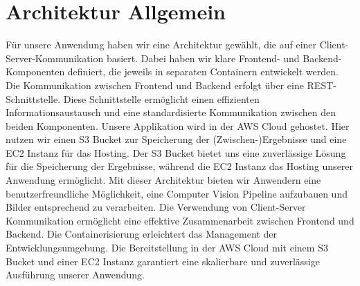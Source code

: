 \section{Architektur Allgemein}
Für unsere Anwendung haben wir eine Architektur gewählt, die auf einer Client-Server-Kommunikation basiert. Dabei haben wir klare Frontend- und Backend-Komponenten definiert, die jeweils in separaten Containern entwickelt werden. Die Kommunikation zwischen Frontend und Backend erfolgt über eine REST-Schnittstelle. Diese Schnittstelle ermöglicht einen effizienten Informationsaustausch und eine standardisierte Kommunikation zwischen den beiden Komponenten. Unsere Applikation wird in der AWS Cloud gehostet. Hier nutzen wir einen S3 Bucket zur Speicherung der (Zwischen-)Ergebnisse und eine EC2 Instanz für das Hosting. Der S3 Bucket bietet uns eine zuverlässige Lösung für die Speicherung der Ergebnisse, während die EC2 Instanz das Hosting unserer Anwendung ermöglicht. Mit dieser Architektur bieten wir Anwendern eine benutzerfreundliche Möglichkeit, eine Computer Vision Pipeline aufzubauen und Bilder entsprechend zu verarbeiten. Die Verwendung von Client-Server Kommunikation ermöglicht eine effektive Zusammenarbeit zwischen Frontend und Backend. Die Containerisierung erleichtert das Management der Entwicklungsumgebung. Die Bereitstellung in der AWS Cloud mit einem S3 Bucket und einer EC2 Instanz garantiert eine skalierbare und zuverlässige Ausführung unserer Anwendung.